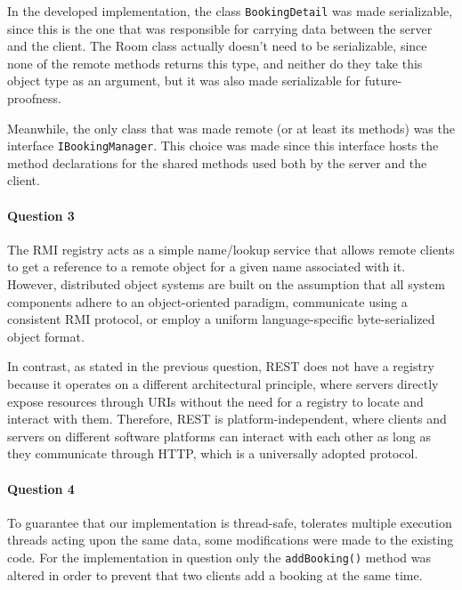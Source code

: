 \documentclass{ds-report}
\begin{document}
    In the developed implementation, the class \texttt{BookingDetail} was made serializable, since this is the one that was responsible for carrying data between the server and the client. The Room class actually doesn't need to be serializable, since none of the remote methods returns this type, and neither do they take this object type as an argument, but it was also made serializable for future-proofness.
    
    Meanwhile, the only class that was made remote (or at least its methods) was the interface \texttt{IBookingManager}. This choice was made since this interface hosts the method declarations for the shared methods used both by the server and the client.
	
    \paragraph{Question 3}
	The RMI registry acts as a simple name/lookup service that allows remote clients to get a reference to a remote object for a given name associated with it. However, distributed object systems are built on the assumption that all system components adhere to an object-oriented paradigm, communicate using a consistent RMI protocol, or employ a uniform language-specific byte-serialized object format. 
    
    In contrast, as stated in the previous question, REST does not have a registry because it operates on a different architectural principle, where servers directly expose resources through URIs without the need for a registry to locate and interact with them. Therefore, REST is platform-independent, where clients and servers on different software platforms can interact with each other as long as they communicate through HTTP, which is a universally adopted protocol.

    \paragraph{Question 4} 

    To guarantee that our implementation is thread-safe, tolerates multiple execution threads acting upon the same data, some modifications were made to the existing code. For the implementation in question only the \texttt{addBooking()} method was altered in order to prevent that two clients add a booking at the same time. 
    
\end{document}

